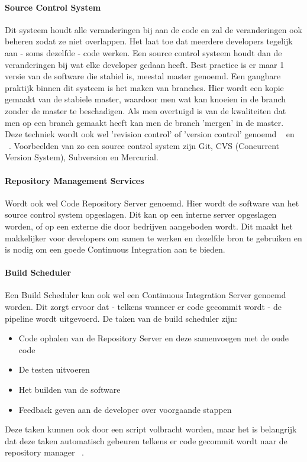         \paragraph{Source Control System}
        Dit systeem houdt alle veranderingen bij aan de code en zal de veranderingen ook beheren zodat ze niet overlappen. Het laat toe dat meerdere developers tegelijk aan - soms dezelfde - code werken. Een source control systeem houdt dan de veranderingen bij wat elke developer gedaan heeft. Best practice is er maar 1 versie van de software die stabiel is, meestal master genoemd. Een gangbare praktijk binnen dit systeem is het maken van branches. Hier wordt een kopie gemaakt van de stabiele master, waardoor men wat kan knoeien in de branch zonder de master te beschadigen. Als men overtuigd is van de kwaliteiten dat men op een branch gemaakt heeft kan men de branch 'mergen' in de master. Deze techniek wordt ook wel 'revision control' of 'version control' genoemd ~\autocite{Skelton2014} en ~\autocite{Riti2018}.
        Voorbeelden van zo een source control system zijn Git, CVS (Concurrent Version System), Subversion en Mercurial.
        
        \paragraph{Repository Management Services}
        Wordt ook wel Code Repository Server genoemd. Hier wordt de software van het source control system opgeslagen. Dit kan op een interne server opgeslagen worden, of op een externe die door bedrijven aangeboden wordt. Dit maakt het makkelijker voor developers om samen te werken en dezelfde bron te gebruiken en is nodig om een goede Continuous Integration aan te bieden.
    
        \paragraph{Build Scheduler}
        Een Build Scheduler kan ook wel een Continuous Integration Server genoemd worden.
        Dit zorgt ervoor dat - telkens wanneer er code gecommit wordt - de pipeline wordt uitgevoerd. De taken van de build scheduler zijn: 
        \begin{itemize}
            \item Code ophalen van de Repository Server en deze samenvoegen met de oude code
            \item De testen uitvoeren
            \item Het builden van de software
            \item Feedback geven aan de developer over voorgaande stappen
        \end{itemize}
        Deze taken kunnen ook door een script volbracht worden, maar het is belangrijk dat deze taken automatisch gebeuren telkens er code gecommit wordt naar de repository manager ~\autocite{Riti2018}.
        
